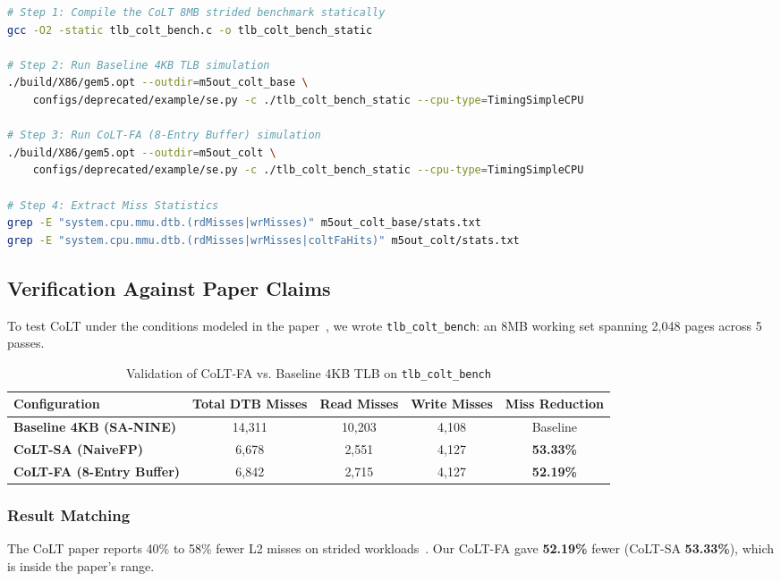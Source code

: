 \begin{lstlisting}[language=bash,caption={Compilation and Execution Commands for CoLT-FA Experiments in \texttt{gem5}},label={lst:cmd_colt}]
# Step 1: Compile the CoLT 8MB strided benchmark statically
gcc -O2 -static tlb_colt_bench.c -o tlb_colt_bench_static

# Step 2: Run Baseline 4KB TLB simulation
./build/X86/gem5.opt --outdir=m5out_colt_base \
    configs/deprecated/example/se.py -c ./tlb_colt_bench_static --cpu-type=TimingSimpleCPU

# Step 3: Run CoLT-FA (8-Entry Buffer) simulation
./build/X86/gem5.opt --outdir=m5out_colt \
    configs/deprecated/example/se.py -c ./tlb_colt_bench_static --cpu-type=TimingSimpleCPU

# Step 4: Extract Miss Statistics
grep -E "system.cpu.mmu.dtb.(rdMisses|wrMisses)" m5out_colt_base/stats.txt
grep -E "system.cpu.mmu.dtb.(rdMisses|wrMisses|coltFaHits)" m5out_colt/stats.txt
\end{lstlisting}

\subsection{Verification Against Paper Claims}
To test CoLT under the conditions modeled in the paper~\cite{pham2012colt}, we wrote \texttt{tlb\_colt\_bench}: an 8MB working set spanning 2,048 pages across 5 passes.

\begin{table}[H]
\centering
\small
\caption{Validation of CoLT-FA vs. Baseline 4KB TLB on \texttt{tlb\_colt\_bench}}
\label{tab:colt_results}
\begin{tabularx}{\textwidth}{lcccc}
\toprule
\textbf{Configuration} & \textbf{Total DTB Misses} & \textbf{Read Misses} & \textbf{Write Misses} & \textbf{Miss Reduction} \\
\midrule
\textbf{Baseline 4KB (SA-NINE)} & 14,311 & 10,203 & 4,108 & Baseline \\
\textbf{CoLT-SA (NaiveFP)} & 6,678 & 2,551 & 4,127 & \textbf{53.33\%} \\
\textbf{CoLT-FA (8-Entry Buffer)} & 6,842 & 2,715 & 4,127 & \textbf{52.19\%} \\
\bottomrule
\end{tabularx}
\end{table}

\subsubsection{Result Matching}
The CoLT paper reports 40\% to 58\% fewer L2 misses on strided workloads~\cite{pham2012colt}. Our CoLT-FA gave \textbf{52.19\%} fewer (CoLT-SA \textbf{53.33\%}), which is inside the paper's range.


